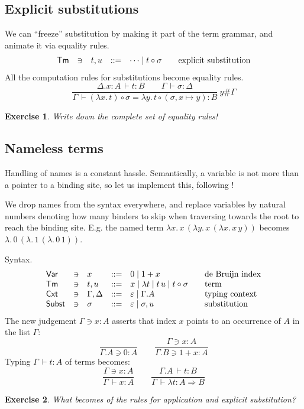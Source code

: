 \documentclass[a4paper,fleqn]{scrartcl}
\newtheorem{exercise}{Exercise}
\newcommand{\comp}{\circ}
\newcommand{\To}{\Rightarrow}
\newcommand{\der}{\,\vdash}
\newcommand{\ru}[2]{\dfrac{#1}{#2}}
\newcommand{\rux}[3]{\ru{#1}{#2}\ #3}
\newcommand{\Var}{\mathsf{Var}}
\newcommand{\Tm}{\mathsf{Tm}}
\newcommand{\Cxt}{\mathsf{Cxt}}
\newcommand{\Subst}{\mathsf{Subst}}
\newcommand{\Gs}{\ensuremath{\sigma}}
\begin{document}
\subsection{Explicit substitutions}

We can ``freeze'' substitution by making it part of the term grammar,
and animate it via equality rules.
\[
\begin{array}{lllrl@{\qquad}l}
\Tm & \ni & t,u & ::= & \dots \mid t \comp \Gs
  & \mbox{explicit substitution} \\
\end{array}
\]
All the computation rules for substitutions become equality rules.
\[
\rux{\Delta.x{:}A \der t : B \qquad \Gamma \der \Gs : \Delta
   }{\Gamma \der (\lambda x.\,t) \comp \Gs
              = \lambda y.\,t \comp (\Gs,x{\mapsto}y) : B
   }{y \# \Gamma}
\]
\begin{exercise}
Write down the complete set of equality rules!
\end{exercise}


\subsection{Nameless terms}

Handling of names is a constant hassle.  Semantically, a variable is
not more than a pointer to a binding site, so let us implement this,
following \textcite{Bruijn72}!

We drop names from the syntax everywhere, and replace variables by
natural numbers denoting how many binders to skip when traversing
towards the root to reach the binding site.  E.g. the named term
$\lambda x.\,x\,(\lambda y.\,x\,(\lambda x.\,x\,y))$ becomes
$\lambda.\,0\,(\lambda.\,1\,(\lambda.\,0\,1))$.

Syntax.
\[
\begin{array}{lllrl@{\qquad}l}
\Var & \ni & x & ::= & 0 \mid 1 + x & \mbox{de Bruijn index} \\
\Tm & \ni & t,u & ::= & x \mid \lambda t \mid t \, u \mid t \comp \Gs & \mbox{term}
  \\
\Cxt & \ni & \Gamma,\Delta & ::= & \varepsilon \mid \Gamma.A
  & \mbox{typing context}\\
\Subst & \ni & \sigma & ::= & \varepsilon \mid \sigma,u
  & \mbox{substitution} \\
\end{array}
\]
The new judgement $\Gamma \ni x : A$ asserts that index $x$ points to an occurrence of $A$ in the list $\Gamma$:
\[
  \ru{}{\Gamma.A \ni 0 : A}
\qquad
  \ru{\Gamma \ni x : A}{\Gamma.B \ni 1 + x : A}
\]
Typing $\Gamma \der t : A$ of terms becomes:
\[
  \ru{\Gamma \ni x : A}{\Gamma \der x : A}
\qquad
  \ru{\Gamma.A \der t : B
    }{\Gamma \der \lambda t : A \To B}
\]
\begin{exercise}
What becomes of the rules for application and explicit substitution?
\end{exercise}
\end{document}
